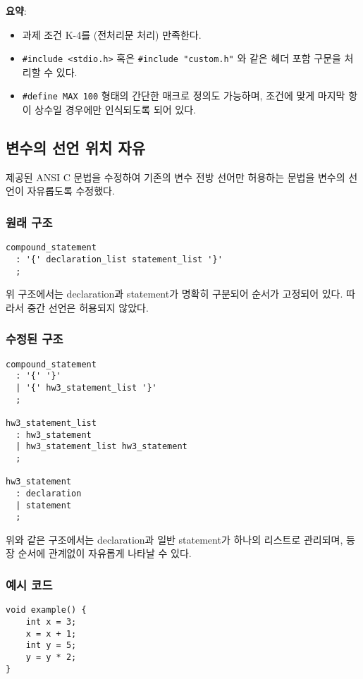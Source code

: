 \documentclass{article}
\begin{document}
  \item \textbf{요약}:
  \begin{itemize}
    \item 과제 조건 K-4를 (전처리문 처리) 만족한다.
    \item \verb|#include <stdio.h>| 혹은 \verb|#include "custom.h"| 와 같은 헤더 포함 구문을 처리할 수 있다.
    \item \verb|#define MAX 100| 형태의 간단한 매크로 정의도 가능하며, 조건에 맞게 마지막 항이 상수일 경우에만 인식되도록 되어 있다.
  \end{itemize}


\subsection{변수의 선언 위치 자유}

제공된 ANSI C 문법을 수정하여 기존의 변수 전방 선어만 허용하는 문법을 변수의 선언이 자유롭도록 수정했다.

\subsubsection*{원래 구조}
\begin{lstlisting}
compound_statement
  : '{' declaration_list statement_list '}'
  ;
\end{lstlisting}

위 구조에서는 declaration과 statement가 명확히 구분되어 순서가 고정되어 있다. 따라서 중간 선언은 허용되지 않았다.

\subsubsection*{수정된 구조}
\begin{lstlisting}
compound_statement
  : '{' '}'
  | '{' hw3_statement_list '}'
  ;

hw3_statement_list
  : hw3_statement
  | hw3_statement_list hw3_statement
  ;

hw3_statement
  : declaration
  | statement
  ;
\end{lstlisting}

위와 같은 구조에서는 declaration과 일반 statement가 하나의 리스트로 관리되며, 등장 순서에 관계없이 자유롭게 나타날 수 있다.

\subsubsection*{예시 코드}
\begin{lstlisting}
void example() {
    int x = 3;
    x = x + 1;
    int y = 5;
    y = y * 2;
}
\end{lstlisting}
\end{document}

